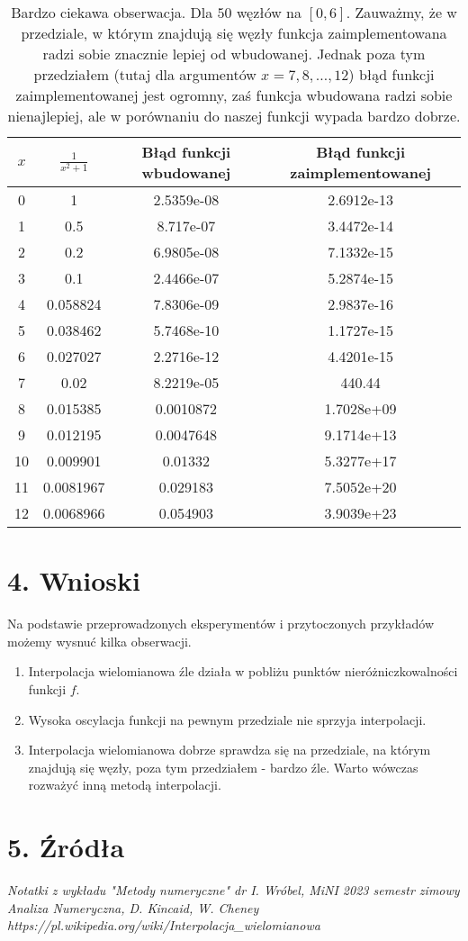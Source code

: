\documentclass{article}
\begin{document}
	\begin{table}
		\centering
		\begin{tabular}{|c|c|c|c|}
			\hline
			$x$ & $\frac{1}{x^2+1}$ & Błąd funkcji wbudowanej & Błąd funkcji zaimplementowanej \\
			\hline
			0 & 1 & 2.5359e-08 & 2.6912e-13 \\
			1 & 0.5 & 8.717e-07 & 3.4472e-14 \\
			2 & 0.2 & 6.9805e-08 & 7.1332e-15 \\
			3 & 0.1 & 2.4466e-07 & 5.2874e-15 \\
			4 & 0.058824 & 7.8306e-09 & 2.9837e-16 \\
			5 & 0.038462 & 5.7468e-10 & 1.1727e-15 \\
			6 & 0.027027 & 2.2716e-12 & 4.4201e-15 \\
			7 & 0.02 & 8.2219e-05 & 440.44 \\
			8 & 0.015385 & 0.0010872 & 1.7028e+09 \\
			9 & 0.012195 & 0.0047648 & 9.1714e+13 \\
			10 & 0.009901 & 0.01332 & 5.3277e+17 \\
			11 & 0.0081967 & 0.029183 & 7.5052e+20 \\
			12 & 0.0068966 & 0.054903 & 3.9039e+23 \\
			\hline
		\end{tabular}
		\caption{Bardzo ciekawa obserwacja. Dla $50$ węzłów na $[0, 6]$. Zauważmy, że w przedziale, w którym znajdują się węzły funkcja zaimplementowana radzi sobie znacznie lepiej od wbudowanej. Jednak poza tym przedziałem (tutaj dla argumentów $x = 7, 8, \ldots, 12$) błąd funkcji zaimplementowanej jest ogromny, zaś funkcja wbudowana radzi sobie nienajlepiej, ale w porównaniu do naszej funkcji wypada bardzo dobrze.}
	\end{table}

\clearpage
	
	\section*{4. Wnioski}
	Na podstawie przeprowadzonych eksperymentów i przytoczonych przykładów możemy wysnuć kilka obserwacji.
	\begin{enumerate}
		\item Interpolacja wielomianowa źle działa w pobliżu punktów nieróżniczkowalności funkcji $f$.
		\item Wysoka oscylacja funkcji na pewnym przedziale nie sprzyja interpolacji.
		\item Interpolacja wielomianowa dobrze sprawdza się na przedziale, na którym znajdują się węzły, poza tym przedziałem - bardzo źle. Warto wówczas rozważyć inną metodą interpolacji.
	\end{enumerate}

	\section*{5. Źródła}
	\textit{Notatki z wykładu "Metody numeryczne" dr I. Wróbel, MiNI 2023 semestr zimowy} \\
	\textit{Analiza Numeryczna, D. Kincaid, W. Cheney} \\
	\textit{https://pl.wikipedia.org/wiki/Interpolacja\_wielomianowa} \\
	
\end{document}
